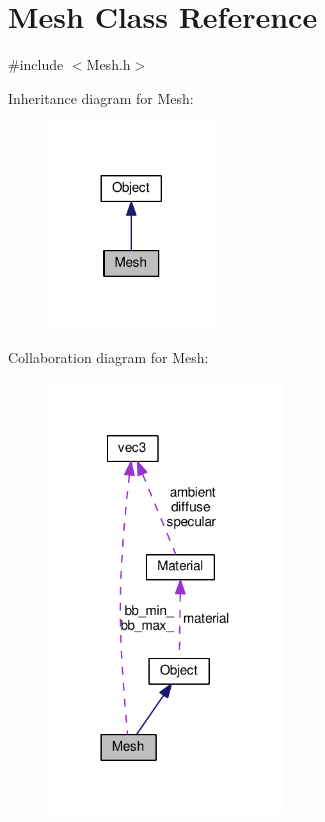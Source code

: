 \hypertarget{classMesh}{}\section{Mesh Class Reference}
\label{classMesh}


{\ttfamily \#include $<$Mesh.\+h$>$}



Inheritance diagram for Mesh\+:
\nopagebreak
\begin{figure}[H]
\begin{center}
\leavevmode
\includegraphics[width=125pt]{classMesh__inherit__graph}
\end{center}
\end{figure}


Collaboration diagram for Mesh\+:
\nopagebreak
\begin{figure}[H]
\begin{center}
\leavevmode
\includegraphics[width=177pt]{classMesh__coll__graph}
\end{center}
\end{figure}
